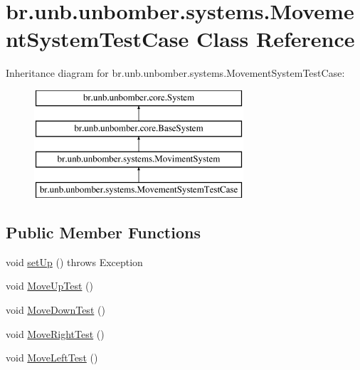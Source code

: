 \hypertarget{classbr_1_1unb_1_1unbomber_1_1systems_1_1_movement_system_test_case}{\section{br.\+unb.\+unbomber.\+systems.\+Movement\+System\+Test\+Case Class Reference}
\label{classbr_1_1unb_1_1unbomber_1_1systems_1_1_movement_system_test_case}
}
Inheritance diagram for br.\+unb.\+unbomber.\+systems.\+Movement\+System\+Test\+Case\+:\begin{figure}[H]
\begin{center}
\leavevmode
\includegraphics[height=4.000000cm]{classbr_1_1unb_1_1unbomber_1_1systems_1_1_movement_system_test_case}
\end{center}
\end{figure}
\subsection*{Public Member Functions}
\begin{DoxyCompactItemize}
\item 
void \hyperlink{classbr_1_1unb_1_1unbomber_1_1systems_1_1_movement_system_test_case_aa0226eed5cb8e96c45f04783f0b4f10f}{set\+Up} ()  throws Exception 
\item 
void \hyperlink{classbr_1_1unb_1_1unbomber_1_1systems_1_1_movement_system_test_case_a58dbdc0e440fa4802d29facd2782c101}{Move\+Up\+Test} ()
\item 
void \hyperlink{classbr_1_1unb_1_1unbomber_1_1systems_1_1_movement_system_test_case_af3092805af3ec4d0acd2338e1ecdb8a5}{Move\+Down\+Test} ()
\item 
void \hyperlink{classbr_1_1unb_1_1unbomber_1_1systems_1_1_movement_system_test_case_a5271b1673b61ef309e91238e38fc9473}{Move\+Right\+Test} ()
\item 
void \hyperlink{classbr_1_1unb_1_1unbomber_1_1systems_1_1_movement_system_test_case_ae10199cf9f98f0f02ece6b24aa0d9a4d}{Move\+Left\+Test} ()
\end{DoxyCompactItemize}
